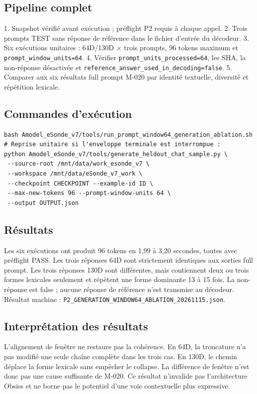 \documentclass[11pt,a4paper]{report}
\begin{document}
\subsection*{Pipeline complet}
\begin{sloppypar}
1. Snapshot vérifié avant exécution ; préflight P2 requis à chaque appel.
2. Trois prompts TEST sans réponse de référence dans le fichier d'entrée du décodeur.
3. Six exécutions unitaires : 64D/130D × trois prompts, 96 tokens maximum et \texttt{prompt\_window\_units=64}.
4. Vérifier \texttt{prompt\_units\_processed=64}, les SHA, la non-réponse désactivée et \texttt{reference\_answer\_used\_in\_decoding=false}.
5. Comparer aux six résultats full prompt M-020 par identité textuelle, diversité et répétition lexicale.
\end{sloppypar}
\subsection*{Commandes d'exécution}
\begin{verbatim}
bash Amodel_eSonde_v7/tools/run_prompt_window64_generation_ablation.sh
# Reprise unitaire si l'enveloppe terminale est interrompue :
python Amodel_eSonde_v7/tools/generate_heldout_chat_sample.py \
 --source-root /mnt/data/work_esonde_v7 \
 --workspace /mnt/data/eSonde_v7_work \
 --checkpoint CHECKPOINT --example-id ID \
 --max-new-tokens 96 --prompt-window-units 64 \
 --output OUTPUT.json
\end{verbatim}
\subsection*{Résultats}
Les six exécutions ont produit 96 tokens en 1,99 à 3,20 secondes, toutes avec préflight PASS. Les trois réponses 64D sont strictement identiques aux sorties full prompt. Les trois réponses 130D sont différentes, mais contiennent deux ou trois formes lexicales seulement et répètent une forme dominante 13 à 15 fois. La non-réponse est false ; aucune réponse de référence n'est transmise au décodeur. Résultat machine : \texttt{P2\_GENERATION\_WINDOW64\_ABLATION\_20261115.json}.
\subsection*{Interprétation des résultats}
L'alignement de fenêtre ne restaure pas la cohérence. En 64D, la troncature n'a pas modifié une seule chaîne complète dans les trois cas. En 130D, le chemin déplace la forme lexicale sans empêcher le collapse. La différence de fenêtre n'est donc pas une cause suffisante de M-020. Ce résultat n'invalide pas l'architecture Obsiss et ne borne pas le potentiel d'une voie contextuelle plus expressive.
\end{document}
